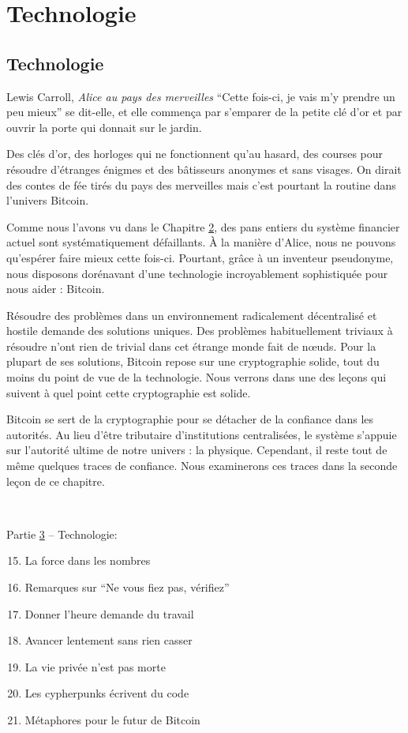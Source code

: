 \part{Technologie}
\label{ch:technology}
\chapter*{Technologie}

\begin{chapquote}{Lewis Carroll, \textit{Alice au pays des merveilles}}
\enquote{Cette fois-ci, je vais m’y prendre un peu mieux} se dit-elle, et elle
commença par s’emparer de la petite clé d’or et par ouvrir la porte qui donnait
sur le jardin.
\end{chapquote}

Des clés d'or, des horloges qui ne fonctionnent qu'au hasard, des courses pour
résoudre d'étranges énigmes et des bâtisseurs anonymes et sans visages. On
dirait des contes de fée tirés du pays des merveilles mais c'est pourtant la
routine dans l'univers Bitcoin.

Comme nous l'avons vu dans le Chapitre \hyperref[ch:economics]{2}, des pans
entiers du système financier actuel sont systématiquement défaillants. À la
manière d'Alice, nous ne pouvons qu'espérer faire mieux cette fois-ci.
Pourtant, grâce à un inventeur pseudonyme, nous disposons dorénavant d'une
technologie incroyablement sophistiquée pour nous aider : Bitcoin.

Résoudre des problèmes dans un environnement radicalement décentralisé et
hostile demande des solutions uniques. Des problèmes habituellement triviaux à
résoudre n'ont rien de trivial dans cet étrange monde fait de nœuds. Pour la
plupart de ses solutions, Bitcoin repose sur une cryptographie solide, tout du
moins du point de vue de la technologie. Nous verrons dans une des leçons qui
suivent à quel point cette cryptographie est solide.

Bitcoin se sert de la cryptographie pour se détacher de la confiance dans les
autorités. Au lieu d'être tributaire d'institutions centralisées, le système
s'appuie sur l'autorité ultime de notre univers : la physique. Cependant, il
reste tout de même quelques traces de confiance. Nous examinerons ces traces
dans la seconde leçon de ce chapitre.

~

\begin{samepage}
Partie \hyperref[ch:technology]{3} -- Technologie:

\begin{enumerate}
  \setcounter{enumi}{14}
  \item La force dans les nombres
  \item Remarques sur \enquote{Ne vous fiez pas, vérifiez}
  \item Donner l'heure demande du travail
  \item Avancer lentement sans rien casser
  \item La vie privée n'est pas morte
  \item Les cypherpunks écrivent du code
  \item Métaphores pour le futur de Bitcoin
\end{enumerate}
\end{samepage}

